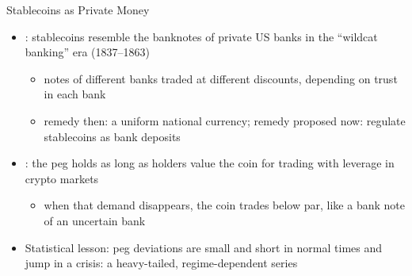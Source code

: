 \begin{frame}{Stablecoins as Private Money}
\itemsize{\small}
\begin{itemize}
    \item {}: stablecoins resemble the banknotes of private US banks in the ``wildcat banking'' era (1837--1863)
    \begin{itemize}
        \item notes of different banks traded at different discounts, depending on trust in each bank
        \item remedy then: a uniform national currency; remedy proposed now: regulate stablecoins as bank deposits
    \end{itemize}
    \item {}: the peg holds as long as holders value the coin for trading with leverage in crypto markets
    \begin{itemize}
        \item when that demand disappears, the coin trades below par, like a bank note of an uncertain bank
    \end{itemize}
    \item Statistical lesson: peg deviations are small and short in normal times and jump in a crisis: a heavy-tailed, regime-dependent series
\end{itemize}
\end{frame}

